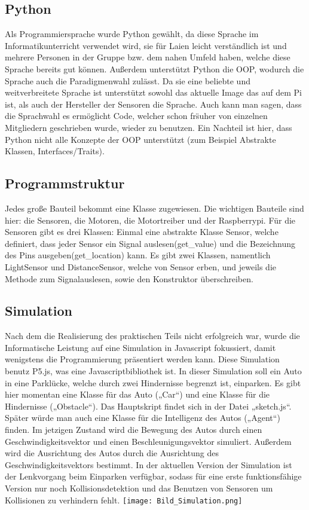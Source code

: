 \documentclass[notitlepage]{report}
\begin{document}
\subsection{Python}
Als Programmiersprache wurde Python gew\"{a}hlt, da  diese Sprache im Informatikunterricht verwendet wird, sie f\"{u}r Laien leicht verst\"{a}ndlich ist und mehrere Personen in der Gruppe bzw. dem nahen Umfeld haben, welche diese Sprache bereits gut k\"{o}nnen. Au{\ss}erdem unterst\"{u}tzt Python die OOP, wodurch die Sprache auch die Paradigmenwahl zul\"{a}sst. Da sie eine beliebte und weitverbreitete Sprache ist unterst\"{u}tzt sowohl das aktuelle Image das auf dem Pi ist, als auch der Hersteller der Sensoren die Sprache. Auch kann man sagen, dass die Sprachwahl es  erm\"{o}glicht Code, welcher schon fr\"s{u}her von einzelnen Mitgliedern geschrieben wurde, wieder zu benutzen.  Ein Nachteil ist hier, dass Python nicht alle Konzepte der OOP unterst\"{u}tzt (zum Beispiel Abstrakte Klassen, Interfaces/Traits).

\subsection{Programmstruktur}
Jedes gro{\ss}e Bauteil bekommt eine Klasse zugewiesen. Die wichtigen Bauteile sind hier: die Sensoren, die Motoren, die Motortreiber und der Raspberrypi. F\"{u}r die Sensoren gibt es drei Klassen: Einmal eine abstrakte Klasse Sensor, welche definiert, dass jeder Sensor ein Signal auslesen(get\_value) und die Bezeichnung des Pins ausgeben(get\_location) kann. Es gibt  zwei Klassen, namentlich LightSensor und DistanceSensor, welche von Sensor erben, und jeweils die Methode zum Signalauslesen, sowie den Konstruktor \"{u}berschreiben.

\subsection{Simulation}
Nach dem die Realisierung des praktischen Teils nicht erfolgreich war, wurde die Informatische Leistung auf eine Simulation in Javascript fokussiert, damit wenigstens die Programmierung pr\"{a}sentiert werden kann. Diese Simulation benutz P5.js, was eine Javascriptbibliothek ist. In dieser Simulation soll ein Auto in eine Parkl\"{u}cke, welche durch zwei Hindernisse begrenzt ist, einparken. Es gibt hier momentan eine Klasse f\"{u}r das Auto („Car“) und eine Klasse f\"{u}r die Hindernisse („Obstacle“). Das Hauptskript findet sich in der Datei „sketch.js“. Sp\"{a}ter w\"{u}rde man auch eine Klasse f\"{u}r die Intelligenz des Autos („Agent“) finden. Im jetzigen Zustand wird die Bewegung des Autos durch einen Geschwindigkeitsvektor und einen Beschleunigungsvektor simuliert. Au{\ss}erdem wird die Ausrichtung des Autos durch die Ausrichtung des Geschwindigkeitsvektors bestimmt. In der aktuellen Version der Simulation ist der Lenkvorgang beim Einparken verf\"{u}gbar, sodass f\"{u}r eine erste funktionsf\"{a}hige Version nur noch Kollisionsdetektion und das Benutzen von Sensoren um Kollisionen zu verhindern fehlt.     
\texttt{[image: Bild\_Simulation.png]}
\end{document}
